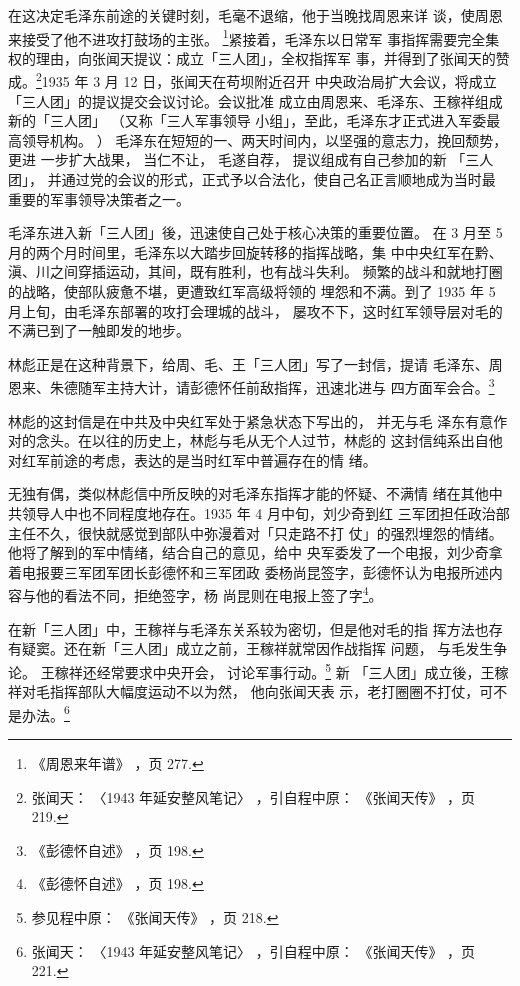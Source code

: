 在这决定毛泽东前途的关键时刻，毛毫不退缩，他于当晚找周恩来详
谈，使周恩来接受了他不进攻打鼓场的主张。 \footnote{《周恩来年谱》
，页 277.}紧接着，毛泽东以日常军
事指挥需要完全集权的理由，向张闻天提议：成立「三人团」，全权指挥军
事，并得到了张闻天的赞成。\footnote{张闻天：
〈1943 年延安整风笔记〉
，引自程中原：
《张闻天传》
，页 219.}1935 年 3 月 12 日，张闻天在苟坝附近召开
中央政治局扩大会议，将成立「三人团」的提议提交会议讨论。会议批准
成立由周恩来、毛泽东、王稼祥组成新的「三人团」
（又称「三人军事领导 小组」，至此，毛泽东才正式进入军委最高领导机构。 ）
毛泽东在短短的一、两天时间内，以坚强的意志力，挽回颓势，更进
一步扩大战果，
当仁不让，
毛遂自荐，
提议组成有自己参加的新
「三人团」，
并通过党的会议的形式，正式予以合法化，使自己名正言顺地成为当时最
重要的军事领导决策者之一。

毛泽东进入新「三人团」後，迅速使自己处于核心决策的重要位置。
在 3 月至 5 月的两个月时间里，毛泽东以大踏步回旋转移的指挥战略，集
中中央红军在黔、滇、川之间穿插运动，其间，既有胜利，也有战斗失利。
频繁的战斗和就地打圈的战略，使部队疲惫不堪，更遭致红军高级将领的
埋怨和不满。到了 1935 年 5 月上旬，由毛泽东部署的攻打会理城的战斗，
屡攻不下，这时红军领导层对毛的不满已到了一触即发的地步。
 
林彪正是在这种背景下，给周、毛、王「三人团」写了一封信，提请
毛泽东、周恩来、朱德随军主持大计，请彭德怀任前敌指挥，迅速北进与
四方面军会合。\footnote{《彭德怀自述》
，页 198.} 
 
林彪的这封信是在中共及中央红军处于紧急状态下写出的，
并无与毛
泽东有意作对的念头。在以往的历史上，林彪与毛从无个人过节，林彪的
这封信纯系出自他对红军前途的考虑，表达的是当时红军中普遍存在的情
绪。

无独有偶，类似林彪信中所反映的对毛泽东指挥才能的怀疑、不满情
绪在其他中共领导人中也不同程度地存在。1935 年 4 月中旬，刘少奇到红
三军团担任政治部主任不久，很快就感觉到部队中弥漫着对「只走路不打
仗」的强烈埋怨的情绪。他将了解到的军中情绪，结合自己的意见，给中
央军委发了一个电报，刘少奇拿着电报要三军团军团长彭德怀和三军团政
委杨尚昆签字，彭德怀认为电报所述内容与他的看法不同，拒绝签字，杨
尚昆则在电报上签了字\footnote{《彭德怀自述》
，页 198.}。

在新「三人团」中，王稼祥与毛泽东关系较为密切，但是他对毛的指
挥方法也存有疑窦。还在新「三人团」成立之前，王稼祥就常因作战指挥
问题， 与毛发生争论。
王稼祥还经常要求中央开会， 讨论军事行动。\footnote{参见程中原：
《张闻天传》
，页 218.} 新 「三人团」成立後，王稼祥对毛指挥部队大幅度运动不以为然，
他向张闻天表
示，老打圈圈不打仗，可不是办法。\footnote{张闻天：
〈1943 年延安整风笔记〉
，引自程中原：
《张闻天传》
，页 221.} 

